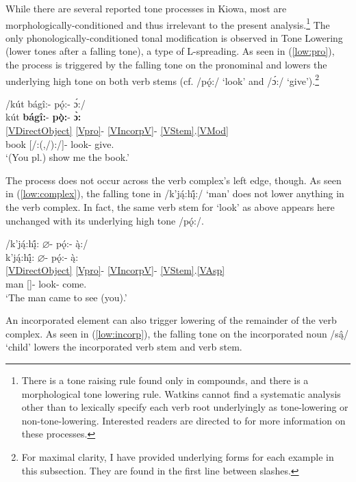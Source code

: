 \documentclass[output=paper]{langscibook}
\begin{document}
While there are several reported tone processes in Kiowa, most are morpholog\-i\-cal\-ly-conditioned and thus irrelevant to the present analysis.\footnote{There
    is a tone raising rule found only in compounds, and there is a morphological tone lowering rule. Watkins cannot find a systematic analysis other than to lexically specify each verb root underlyingly as tone-lowering or non-tone-lowering. Interested readers are directed to \citet{Watkins:1984} for more information on these processes.}
The only phono\-log\-i\-cal\-ly-conditioned tonal modification is observed in Tone Lowering (lower tones after a falling tone), a type of L-spreading. As seen in (\ref{low:pro}), the process is triggered by the falling tone on the pronominal and lowers the underlying high tone on both verb stems (cf. /p\k{ó}:/ `look' and /\'{ɔ}:/ `give').\footnote{For maximal clarity, I have provided underlying forms for each example in this subsection. They are found in the first line between slashes.}

\ea \label{low:pro}
\gllll /kút bágî:- p\k{ó}:- \'{ɔ}:/ \\
kút \textbf{bágî:}- \textbf{p\k{ò}:}- \textbf{\`{ɔ}:}\\
\ref{VDirectObject} {\ref{Vpro}}- \ref{VIncorpV}- \ref{VStem}.\ref{VMod} \\
book [\Second\Pl/\Aarg:(\First,\Third\Sg/\Parg):\Pl/\Obj]- look- give.{\Imp}\\
\trans `(You pl.) show me the book.' \citep[adapted from][92]{Miller:2018} %
\z 

\noindent The process does not occur across the verb complex's left edge, though. As seen in (\ref{low:complex}), the falling tone in /k'j\k{á}:h\k{î}:/ `man' does not lower anything in the verb complex. In fact, the same verb stem for `look' as above appears here unchanged with its underlying high tone /p\k{ó}:/.

\ea \label{low:complex}
\gllll /k'j\k{á}:h\k{î}: $\varnothing$- p\k{ó}:- \k{\`a}:/ \\
k'j\k{á}:h\k{î}: $\varnothing$- p\k{ó}:- \k{\`a}:\\
\ref{VDirectObject} {\ref{Vpro}}- \ref{VIncorpV}- \ref{VStem}.\ref{VAsp} \\
man [\Third\Sg]- look- come.{\Pfv} \\
\trans `The man came to see (you).' \citep[][98]{Miller:2018} %
\z 

An incorporated element can also trigger lowering of the remainder of the verb complex. As seen in (\ref{low:incorp}), the falling tone on the incorporated noun /s\k{â}/ `child' lowers the incorporated verb stem and verb stem.
\end{document}
